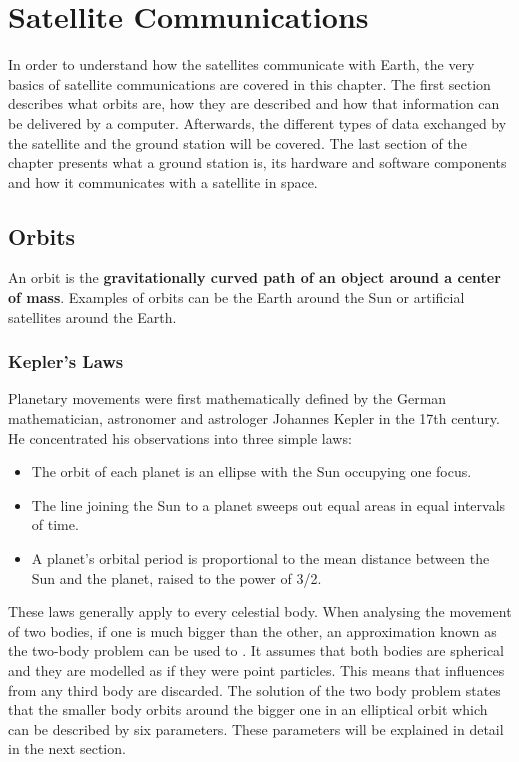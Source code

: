 

\chapter{Satellite Communications}

In order to understand how  the satellites communicate with Earth, the very basics of satellite communications are covered in this chapter. The first section describes what orbits are, how they are described and how that information can be delivered by a computer. Afterwards, the different types of data exchanged by the satellite and the ground station will be covered. The last section of the chapter presents what a ground station is, its hardware and software components and how it communicates with a satellite in space.


\section{Orbits}
An orbit is the \textbf{gravitationally curved path of an object around a center of mass}. Examples of orbits can be the Earth around the Sun or artificial satellites around the Earth.



\subsection{Kepler's Laws}
Planetary movements were first mathematically defined by the German mathematician, astronomer and astrologer Johannes Kepler in the 17th century. He concentrated his observations into three simple laws\citep{SSEng}:
\begin{itemize}

\item The orbit of each planet is an ellipse with the Sun occupying one focus.
\item The line joining the Sun to a planet sweeps out equal areas in equal intervals of time.
\item A planet's orbital period is proportional to the mean distance between the Sun and the planet, raised to the power of 3/2.
\end{itemize} 

These laws generally apply to every celestial body. When analysing the movement of two bodies, if one is much bigger than the other, an approximation known as the two-body problem can be used to . It assumes that both bodies are spherical and they are modelled as if they were point particles. This means that influences from any third body are discarded. The solution of the two body problem states that the smaller body orbits around the bigger one in an elliptical orbit which can be described by six parameters. These parameters will be explained in detail in the next section.


